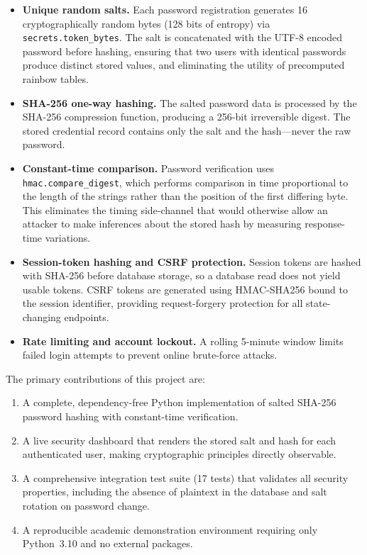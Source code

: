 \begin{itemize}
  \item \textbf{Unique random salts.} Each password registration generates 16 cryptographically random bytes (128 bits of entropy) via \texttt{secrets.token\_bytes}. The salt is concatenated with the UTF-8 encoded password before hashing, ensuring that two users with identical passwords produce distinct stored values, and eliminating the utility of precomputed rainbow tables.

  \item \textbf{SHA-256 one-way hashing.} The salted password data is processed by the SHA-256 compression function, producing a 256-bit irreversible digest. The stored credential record contains only the salt and the hash---never the raw password.

  \item \textbf{Constant-time comparison.} Password verification uses \texttt{hmac.compare\_digest}, which performs comparison in time proportional to the length of the strings rather than the position of the first differing byte. This eliminates the timing side-channel that would otherwise allow an attacker to make inferences about the stored hash by measuring response-time variations.

  \item \textbf{Session-token hashing and CSRF protection.} Session tokens are hashed with SHA-256 before database storage, so a database read does not yield usable tokens. CSRF tokens are generated using HMAC-SHA256 bound to the session identifier, providing request-forgery protection for all state-changing endpoints.

  \item \textbf{Rate limiting and account lockout.} A rolling 5-minute window limits failed login attempts to prevent online brute-force attacks.
\end{itemize}

The primary contributions of this project are:

\begin{enumerate}
  \item A complete, dependency-free Python implementation of salted SHA-256 password hashing with constant-time verification.
  \item A live security dashboard that renders the stored salt and hash for each authenticated user, making cryptographic principles directly observable.
  \item A comprehensive integration test suite (17 tests) that validates all security properties, including the absence of plaintext in the database and salt rotation on password change.
  \item A reproducible academic demonstration environment requiring only Python~3.10 and no external packages.
\end{enumerate}

